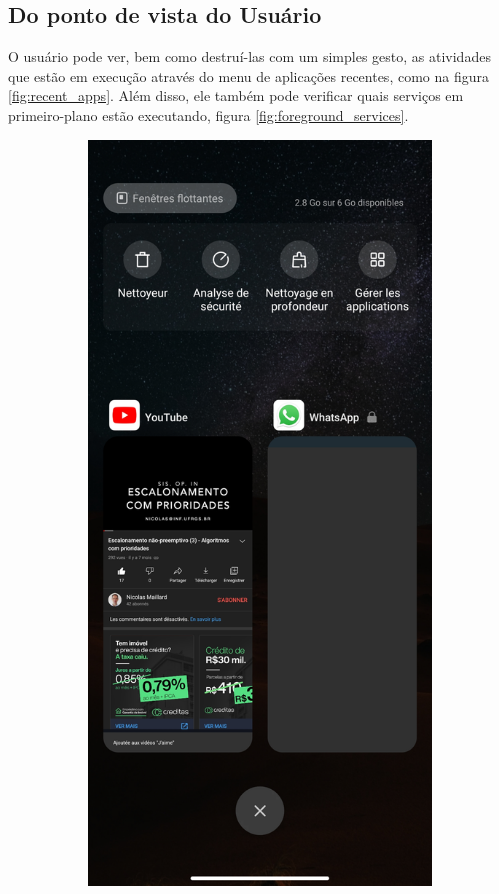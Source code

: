 \documentclass[12pt, a4paper]{article}
\begin{document}
    \subsection{Do ponto de vista do Usuário}
    O usuário pode ver, bem como destruí-las com um simples gesto, as atividades que estão em execução através do menu de aplicações recentes, como na figura \ref{fig:recent_apps}. Além disso, ele também pode verificar quais serviços em primeiro-plano estão executando, figura \ref{fig:foreground_services}.
   \begin{figure}[!ht]
        \centering
        \hfill
        \begin{subfigure}{0.3\textwidth}
            \includegraphics[width=\textwidth,height=0.3\textheight,keepaspectratio]{recents_apps.jpg}

\end{subfigure}
\end{figure}
\end{document}

